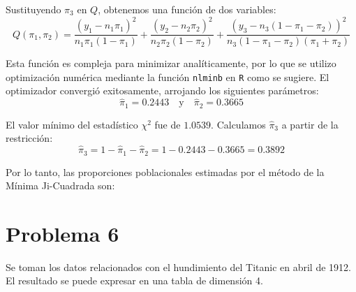 Sustituyendo $\pi_3$ en $Q$, obtenemos una función de dos variables:
\begin{equation}
    Q(\pi_1, \pi_2) = \frac{(y_1 - n_1\pi_1)^2}{n_1\pi_1(1-\pi_1)} + \frac{(y_2 - n_2\pi_2)^2}{n_2\pi_2(1-\pi_2)} + \frac{(y_3 - n_3(1 - \pi_1 - \pi_2))^2}{n_3(1 - \pi_1 - \pi_2)(\pi_1 + \pi_2)}
\end{equation}

Esta función es compleja para minimizar analíticamente, por lo que se utilizo optimización numérica mediante la función \texttt{nlminb} en \texttt{R} como se sugiere. El optimizador convergió exitosamente, arrojando los siguientes parámetros:
\begin{equation}
    \hat{\pi}_1 = 0.2443 \quad \text{y} \quad \hat{\pi}_2 = 0.3665
\end{equation}

El valor mínimo del estadístico $\chi^2$ fue de $1.0539$.
Calculamos $\hat{\pi}_3$ a partir de la restricción:
\begin{equation}
    \hat{\pi}_3 = 1 - \hat{\pi}_1 - \hat{\pi}_2 = 1 - 0.2443 - 0.3665 = 0.3892
\end{equation}

Por lo tanto, las proporciones poblacionales estimadas por el método de la Mínima Ji-Cuadrada son:


\begin{center}
\end{center}

\newpage


\section*{Problema \textcolor{CIMATRed}{6}}

Se toman los datos relacionados con el hundimiento del Titanic en abril de 1912. El resultado se puede expresar en una tabla de dimensión 4.

